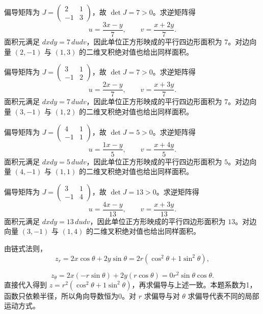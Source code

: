 \documentclass[UTF8,12pt,a4paper,fontset=fandol]{ctexart}
\begin{document}
\begin{solve}\label{ans:c33q3}
偏导矩阵为 $J=\begin{pmatrix}2&1\\-1&3\end{pmatrix}$，故 $\det J=7>0$。求逆矩阵得
\[
u=\frac{3x-y}{7},\qquad v=\frac{x+2y}{7}.
\]
面积元满足 $dxdy=7\,dudv$，因此单位正方形映成的平行四边形面积为 $7$。对边向量 $(2,-1)$ 与 $(1,3)$ 的二维叉积绝对值也给出同样面积。
\end{solve}

\begin{solve}\label{ans:c33q4}
偏导矩阵为 $J=\begin{pmatrix}3&1\\-1&2\end{pmatrix}$，故 $\det J=7>0$。求逆矩阵得
\[
u=\frac{2x-y}{7},\qquad v=\frac{x+3y}{7}.
\]
面积元满足 $dxdy=7\,dudv$，因此单位正方形映成的平行四边形面积为 $7$。对边向量 $(3,-1)$ 与 $(1,2)$ 的二维叉积绝对值也给出同样面积。
\end{solve}

\begin{solve}\label{ans:c33q5}
偏导矩阵为 $J=\begin{pmatrix}4&1\\-1&1\end{pmatrix}$，故 $\det J=5>0$。求逆矩阵得
\[
u=\frac{1x-y}{5},\qquad v=\frac{x+4y}{5}.
\]
面积元满足 $dxdy=5\,dudv$，因此单位正方形映成的平行四边形面积为 $5$。对边向量 $(4,-1)$ 与 $(1,1)$ 的二维叉积绝对值也给出同样面积。
\end{solve}

\begin{solve}\label{ans:c33q6}
偏导矩阵为 $J=\begin{pmatrix}3&1\\-1&4\end{pmatrix}$，故 $\det J=13>0$。求逆矩阵得
\[
u=\frac{4x-y}{13},\qquad v=\frac{x+3y}{13}.
\]
面积元满足 $dxdy=13\,dudv$，因此单位正方形映成的平行四边形面积为 $13$。对边向量 $(3,-1)$ 与 $(1,4)$ 的二维叉积绝对值也给出同样面积。
\end{solve}

\begin{solve}\label{ans:c33q7}
由链式法则，
\[
z_r=2x\cos\theta+2y\sin\theta=2r(\cos^2\theta+1\sin^2\theta),
\]

\[
z_\theta=2x(-r\sin\theta)+2y(r\cos\theta)=0r^2\sin\theta\cos\theta.
\]
直接代入得到 $z=r^2(\cos^2\theta+1\sin^2\theta)$，再求偏导与上述一致。本题系数为1，函数只依赖半径，所以角向导数恒为0。对 $r$ 求偏导与对 $\theta$ 求偏导代表不同的局部运动方式。
\end{solve}
\end{document}
